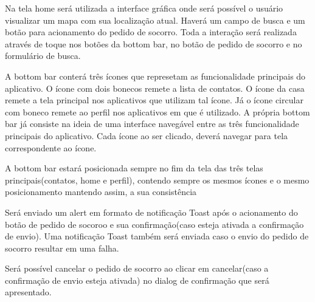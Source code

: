 Na tela home será utilizada a interface gráfica onde será possível o usuário visualizar um mapa com sua localização atual. Haverá um campo de busca e um botão para acionamento do pedido de socorro. Toda a interação será realizada através de toque nos botões da bottom bar, no botão de pedido de socorro e no formulário de busca.

A bottom bar conterá três ícones que represetam as funcionalidade principais do aplicativo. O ícone com dois bonecos remete a lista de contatos. O ícone da casa remete a tela principal nos aplicativos que utilizam tal ícone. Já o ícone circular com boneco remete ao perfil nos aplicativos em que é utilizado. A própria bottom bar já consiste na ideia de uma interface navegável entre as três funcionalidade principais do aplicativo. Cada ícone ao ser clicado, deverá navegar para tela correspondente ao ícone.

A bottom bar estará posicionada sempre no fim da tela das três telas principais(contatos, home e perfil), contendo sempre os mesmos ícones e o mesmo posicionamento mantendo assim, a sua consistência

Será enviado um alert em formato de notificação Toast após o acionamento do botão de pedido de socoroo e sua confirmação(caso esteja ativada a confirmação de envio). Uma notificação Toast também será enviada caso o envio do pedido de socorro resultar em uma falha. 

Será possível cancelar o pedido de socorro ao clicar em cancelar(caso a confirmação de envio esteja ativada) no dialog de confirmação que será apresentado. 

